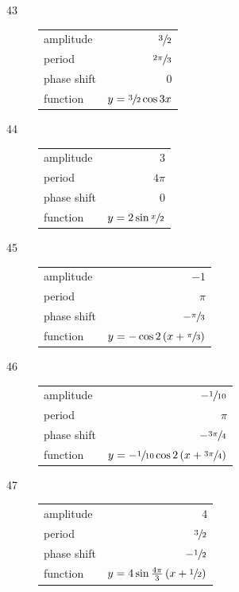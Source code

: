 \documentclass{exam}
\begin{document}
\begin{description}
    \item[43]
      \begin{tabular}[H]{lr}
        \toprule
        amplitude   & $\sfrac{3}{2}$ \\
        period      & $\sfrac{2 \pi}{3}$ \\
        phase shift & $0$ \\
        function    & $y = \sfrac{3}{2} \cos 3x$ \\
        \bottomrule
      \end{tabular}

    \item[44]
      \begin{tabular}[H]{lr}
        \toprule
        amplitude   & $3$ \\
        period      & $4 \pi$ \\
        phase shift & $0$ \\
        function    & $y = 2 \sin \sfrac{x}{2}$ \\
        \bottomrule
      \end{tabular}

    \item[45]
      \begin{tabular}[H]{lr}
        \toprule
        amplitude   & $-1$ \\
        period      & $\pi$ \\
        phase shift & $- \sfrac{\pi}{3}$ \\
        function    & $y = - \cos 2 \left( x + \sfrac{\pi}{3} \right)$ \\
        \bottomrule
      \end{tabular}

    \item[46]
      \begin{tabular}[H]{lr}
        \toprule
        amplitude   & $- \sfrac{1}{10}$ \\
        period      & $\pi$ \\
        phase shift & $- \sfrac{3 \pi}{4}$ \\
        function    & $y = - \sfrac{1}{10} \cos 2 \left( x + \sfrac{3 \pi}{4} \right)$ \\
        \bottomrule
      \end{tabular}

    \item[47]
      \begin{tabular}[H]{lr}
        \toprule
        amplitude   & $4$ \\
        period      & $\sfrac{3}{2}$ \\
        phase shift & $- \sfrac{1}{2}$ \\
        function    & $y = 4 \sin \frac{4 \pi}{3} \left( x + \sfrac{1}{2} \right)$ \\
        \bottomrule
      \end{tabular}


\end{description}
\end{document}
